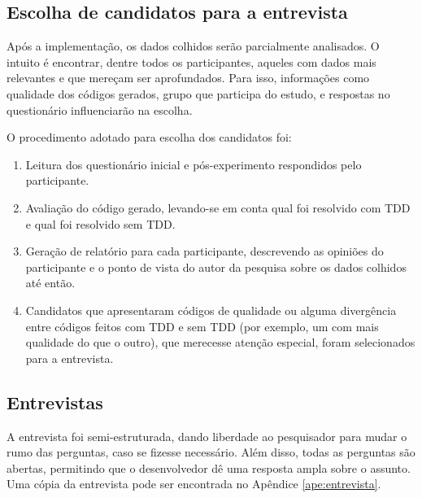 
\subsection{Escolha de candidatos para a entrevista}

Após a implementação, os dados colhidos serão parcialmente analisados. O intuito
é encontrar, dentre todos os participantes, aqueles com dados mais relevantes
e que mereçam ser aprofundados.
Para isso, informações como qualidade dos códigos gerados, grupo que participa
do estudo, e respostas no questionário influenciarão na escolha.

O procedimento adotado para escolha dos candidatos foi:

\begin{enumerate}
	\item Leitura dos questionário inicial e pós-experimento respondidos pelo participante.
	
	\item Avaliação do código gerado, levando-se em conta qual foi resolvido com TDD e qual
	foi resolvido sem TDD.
	
	\item Geração de relatório para cada participante, descrevendo as opiniões do participante
	e o ponto de vista do autor da pesquisa sobre os dados colhidos até então.
	
	\item Candidatos que apresentaram códigos de qualidade ou alguma divergência entre códigos
	feitos com TDD e sem TDD (por exemplo, um com mais qualidade do que o outro), que merecesse
	atenção especial, foram selecionados para a entrevista.
\end{enumerate}

\subsection{Entrevistas}
\label{sec:planejamento-estrategia-entrevistas}

A entrevista foi semi-estruturada, dando liberdade ao
pesquisador para mudar o rumo das perguntas, caso se fizesse necessário.
Além disso, todas as perguntas são abertas, permitindo que o desenvolvedor dê
uma resposta ampla sobre o assunto. Uma cópia da entrevista pode ser encontrada
no Apêndice \ref{ape:entrevista}.

